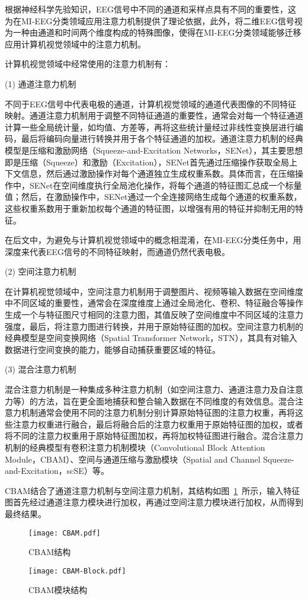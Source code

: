 根据神经科学先验知识，EEG信号中不同的通道和采样点具有不同的重要性，这为在MI-EEG分类领域应用注意力机制提供了理论依据，此外，将二维EEG信号视为一种由通道和时间两个维度构成的特殊图像，使得在MI-EEG分类领域能够迁移应用计算机视觉领域中的注意力机制。

计算机视觉领域中经常使用的注意力机制有：

(1) 通道注意力机制
    
不同于EEG信号中代表电极的通道，计算机视觉领域的通道代表图像的不同特征映射。通道注意力机制用于调整不同特征通道的重要性，通常会对每一个特征通道计算一些全局统计量，如均值、方差等，再将这些统计量经过非线性变换层进行编码，最后将编码向量进行转换并用于各个特征通道的加权。通道注意力机制的经典模型是压缩和激励网络（Squeeze-and-Excitation Networks，SENet）\cite{8578843}，其主要思想即是压缩（Squeeze）和激励（Excitation），SENet首先通过压缩操作获取全局上下文信息，然后通过激励操作对每个通道独立生成权重系数。具体而言，在压缩操作中，SENet在空间维度执行全局池化操作，将每个通道的特征图汇总成一个标量值；然后，在激励操作中，SENet通过一个全连接网络生成每个通道的权重系数，这些权重系数用于重新加权每个通道的特征图，以增强有用的特征并抑制无用的特征。

在后文中，为避免与计算机视觉领域中的概念相混淆，在MI-EEG分类任务中，用深度来代表EEG信号的不同特征映射，而通道仍然代表电极。

(2) 空间注意力机制
    
在计算机视觉领域中，空间注意力机制用于调整图片、视频等输入数据在空间维度中不同区域的重要性，通常会在深度维度上通过全局池化、卷积、特征融合等操作生成一个与特征图尺寸相同的注意力图，其值反映了空间维度中不同区域的注意力强度，最后，将注意力图进行转换，并用于原始特征图的加权。空间注意力机制的经典模型是空间变换网络（Spatial Transformer Network，STN）\cite{jaderberg2015spatial}，其具有对输入数据进行空间变换的能力，能够自动捕获重要区域的特征。

(3) 混合注意力机制
    
混合注意力机制是一种集成多种注意力机制（如空间注意力、通道注意力及自注意力等）的方法，旨在更全面地捕获和整合输入数据在不同维度的有效信息。混合注意力机制通常会使用不同的注意力机制分别计算原始特征图的注意力权重，再将这些注意力权重进行融合，最后将融合后的注意力权重用于原始特征图的加权，或者将不同的注意力权重用于原始特征图加权，再将加权特征图进行融合。混合注意力机制的经典模型有卷积注意力机制模块（Convolutional Block Attention Module，CBAM）\cite{woo2018cbam}、空间与通道压缩与激励模块（Spatial and Channel Squeeze-and-Excitation，scSE）\cite{roy2018concurrent}等。
    
CBAM结合了通道注意力机制与空间注意力机制，其结构如图~\ref{fig:CBAM}~所示，输入特征图首先经过通道注意力模块进行加权，再通过空间注意力模块进行加权，从而得到最终结果。
\begin{figure}
    \centering
    \texttt{[image: CBAM.pdf]}
    \caption{CBAM结构\cite{woo2018cbam}}
    \label{fig:CBAM}
\end{figure}
\begin{figure}
    \centering
    \texttt{[image: CBAM-Block.pdf]}
    \caption{CBAM模块结构\cite{woo2018cbam}}
    \label{fig:CBAM-Block}
  \end{figure}

